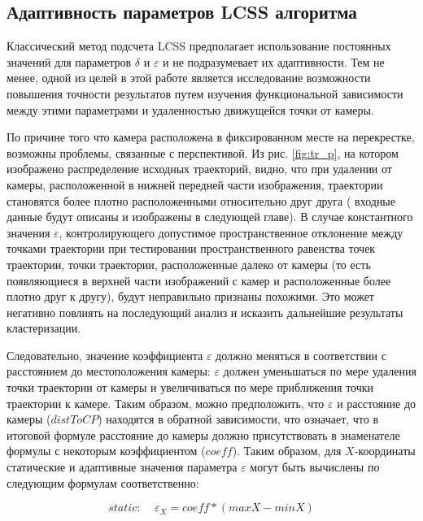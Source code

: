 \subsection{Адаптивность параметров LCSS алгоритма}

Классический метод подсчета LCSS предполагает использование постоянных значений для параметров $\delta$ и $\varepsilon$ и не подразумевает их адаптивности. Тем не менее, одной из целей в этой работе является исследование возможности повышения точности результатов путем изучения функциональной зависимости между этими параметрами и удаленностью движущейся точки от камеры.

По причине того что камера расположена в фиксированном месте на перекрестке, возможны проблемы, связанные с перспективой. Из рис. \ref{fig:tr_p}, на котором изображено распределение исходных траекторий, видно, что при удалении от камеры, расположенной в нижней передней части изображения, траектории становятся более плотно расположенными относительно друг друга ( входные данные будут описаны и изображены в следующей главе). В случае константного значения $\varepsilon$, контролирующего допустимое пространственное отклонение между точками траектории при тестировании пространственного равенства точек траектории, точки траектории, расположенные далеко от камеры (то есть появляющиеся в верхней части изображений с камер и расположенные более плотно друг к другу), будут неправильно признаны похожими. Это может негативно повлиять на последующий анализ и исказить дальнейшие результаты кластеризации.

Следовательно, значение коэффициента $\varepsilon$ должно меняться в соответствии с расстоянием до местоположения камеры: $\varepsilon$ должен уменьшаться по мере удаления точки траектории от камеры и увеличиваться по мере приближения точки траектории к камере. Таким образом, можно предположить, что $\varepsilon$ и расстояние до камеры ($distToCP$) находятся в обратной зависимости, что означает, что в итоговой формуле расстояние до камеры должно присутствовать в знаменателе формулы с некоторым коэффициентом ($coeff$). Таким образом, для $X$-координаты статические и адаптивные значения параметра $\varepsilon$ могут быть вычислены по следующим формулам соответственно:

\begin{equation} \label{eq:st_eps}
	static: \ \ \ \ \ \varepsilon_{X} = coeff * (maxX - minX)
\end{equation}


